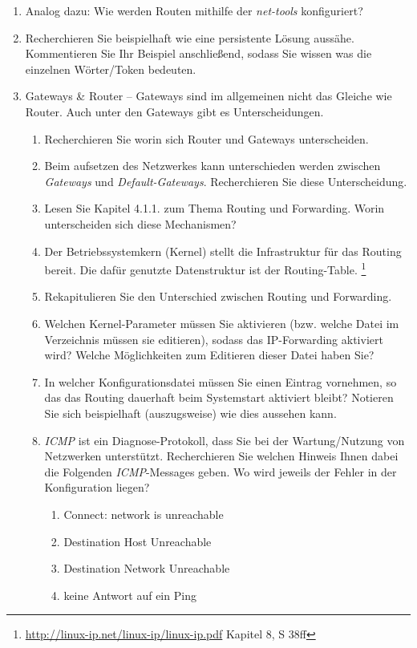 \documentclass[paper=a4,fontsize=11pt]{scrartcl}%
\numberwithin{equation}{section}
\begin{document}
\begin{enumerate}
	\item Analog dazu: Wie werden Routen mithilfe der \emph{net-tools} konfiguriert?
	\item Recherchieren Sie beispielhaft wie eine persistente Lösung aussähe. Kommentieren Sie 	Ihr Beispiel anschließend, sodass Sie wissen was die einzelnen Wörter/Token bedeuten.
	\item Gateways \& Router -- Gateways sind im allgemeinen nicht das Gleiche wie Router. Auch unter den Gateways gibt es Unterscheidungen.
	\begin{enumerate}
		\item Recherchieren Sie worin sich Router und Gateways unterscheiden.
		\item Beim aufsetzen des Netzwerkes kann unterschieden werden zwischen \emph{Gateways} und \emph{Default-Gateways}. Recherchieren Sie diese Unterscheidung.
	\item Lesen Sie Kapitel 4.1.1. \cite[S. 308ff]{Kurose2012} zum Thema Routing und Forwarding. Worin unterscheiden sich diese Mechanismen?
	\item Der Betriebssystemkern (Kernel) stellt die Infrastruktur für das Routing bereit. Die dafür genutzte Datenstruktur ist der Routing-Table. \footnote{\url{http://linux-ip.net/linux-ip/linux-ip.pdf} Kapitel 8, S 38ff}
	\item Rekapitulieren Sie den Unterschied zwischen Routing und Forwarding.
	\item Welchen Kernel-Parameter müssen Sie aktivieren (bzw. welche Datei im  Verzeichnis müssen sie editieren), sodass das IP-Forwarding aktiviert wird? Welche Möglichkeiten zum Editieren dieser Datei haben Sie?
	\item In welcher Konfigurationsdatei müssen Sie einen Eintrag vornehmen, so das das Routing dauerhaft beim Systemstart aktiviert bleibt? Notieren Sie sich beispielhaft (auszugsweise) wie dies aussehen kann.
	\item \emph{ICMP} ist ein Diagnose-Protokoll, dass Sie bei der Wartung/Nutzung von Netzwerken unterstützt. Recherchieren Sie welchen Hinweis Ihnen dabei die Folgenden \emph{ICMP}-Messages geben. Wo wird jeweils der Fehler in der Konfiguration liegen?
	\begin{enumerate}
		\item Connect: network is unreachable
		\item Destination Host Unreachable
		\item Destination Network Unreachable
		\item keine Antwort auf ein Ping

\end{enumerate}
\end{enumerate}
\end{enumerate}
\end{document}
